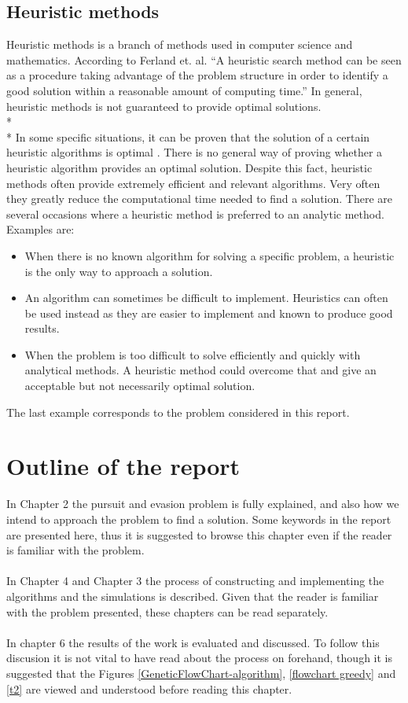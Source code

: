 \subsection{Heuristic methods}
Heuristic methods is a branch of methods used in computer science and mathematics. According to Ferland et. al. \cite{heuristics} ``A heuristic search method can be seen as a procedure taking advantage of the problem structure in order to identify a good solution within a reasonable amount of computing time.''
In general, heuristic methods is not guaranteed to provide optimal solutions.\\*%
\\*
In some specific situations, it can be proven that the solution of a certain heuristic algorithms is optimal%
. There is no general way of proving whether a heuristic algorithm provides an optimal solution. Despite this fact, heuristic methods often provide extremely efficient and relevant algorithms. Very often they greatly reduce the computational time needed to find a solution. There are several occasions where a heuristic method is preferred to an analytic method. Examples are:
\begin{itemize}
\item When there is no known algorithm for solving a specific problem, a heuristic is the only way to approach a solution.
\item An algorithm can sometimes be difficult to implement. Heuristics can often be used instead as they are easier to implement and known to produce good results.
\item When the problem is too difficult to solve efficiently and quickly with analytical methods. A heuristic method could overcome that and give an acceptable but not necessarily optimal solution.
\end{itemize}

The last example corresponds to the problem considered in this report.
\section{Outline of the report}
In Chapter 2 the pursuit and evasion problem is fully explained, and also how we intend to approach the problem to find a solution. Some keywords in the report are presented here, thus it is suggested to browse this chapter even if the reader is familiar with the problem.\\
\\In Chapter 4 and Chapter 3 the process of constructing and implementing the algorithms and the simulations is described. Given that the reader is familiar with the problem presented, these chapters can be read separately.\\
\\In chapter 6 the results of the work is evaluated and discussed. To follow this discusion it is not vital to have read about the process on forehand, though it is suggested that the Figures \ref{GeneticFlowChart-algorithm}, \ref{flowchart greedy} and \ref{t2} are viewed and understood before reading this chapter.



